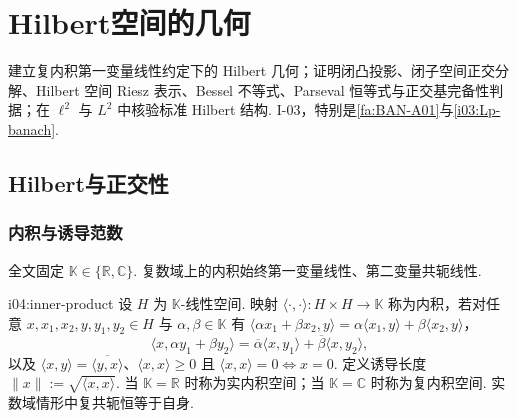 \chapter{Hilbert空间的几何}\label{chap:I-04}
\FAChapterOpening
{建立复内积第一变量线性约定下的 Hilbert 几何；证明闭凸投影、闭子空间正交分解、Hilbert 空间 Riesz 表示、Bessel 不等式、Parseval 恒等式与正交基完备性判据；在 \(\displaystyle \ell^2\) 与 \(\displaystyle L^2\) 中核验标准 Hilbert 结构.}
{I-03，特别是\autoref{fa:BAN-A01}与\autoref{i03:Lp-banach}.}
{\begin{center}
\end{center}}

\section{Hilbert与正交性}\label{sec:i04-hilbert-orthogonality}

\subsection{内积与诱导范数}

全文固定 \(\displaystyle \mathbb K\in\{\mathbb R,\mathbb C\}\). 复数域上的内积始终第一变量线性、第二变量共轭线性.

\begin{FADefinition}[B][内积与诱导长度]{i04:inner-product}
设 \(\displaystyle H\) 为 \(\displaystyle \mathbb K\)-线性空间. 映射 \(\displaystyle \langle\cdot,\cdot\rangle:H\times H\to\mathbb K\) 称为内积，若对任意 \(\displaystyle x,x_1,x_2,y,y_1,y_2\in H\) 与 \(\displaystyle \alpha,\beta\in\mathbb K\) 有 \(\displaystyle \langle\alpha x_1+\beta x_2,y\rangle =\alpha\langle x_1,y\rangle+\beta\langle x_2,y\rangle\)，
\[
\langle x,\alpha y_1+\beta y_2\rangle
=\overline\alpha\langle x,y_1\rangle+\overline\beta\langle x,y_2\rangle,
\]
以及 \(\displaystyle \langle x,y\rangle=\overline{\langle y,x\rangle}\)、\(\displaystyle \langle x,x\rangle\geqslant0\) 且 \(\displaystyle \langle x,x\rangle=0\iff x=0\). 定义诱导长度 \(\displaystyle \|x\|:=\sqrt{\langle x,x\rangle}\).
当 \(\displaystyle \mathbb K=\mathbb R\) 时称为实内积空间；当 \(\displaystyle \mathbb K=\mathbb C\) 时称为复内积空间. 实数域情形中复共轭恒等于自身.
\end{FADefinition}

